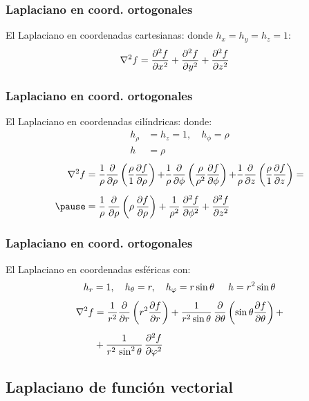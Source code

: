 \documentclass[12pt]{beamer}
\begin{document}
\begin{frame}
\frametitle{Laplaciano en coord. ortogonales}
El Laplaciano en coordenadas cartesianas:
\pause
donde $h_{x} = h_{y} = h_{z} = 1$:
\begin{align*}
\laplacian{f} &= \pdv[2]{f}{x} + \pdv[2]{f}{y} + \pdv[2]{f}{z}
\end{align*}
\end{frame}
\begin{frame}
\frametitle{Laplaciano en coord. ortogonales}
El Laplaciano en coordenadas cilíndricas:
\pause
donde:
\begin{align*}
h_{\rho} &= h_{z} = 1, \quad h_{\phi} = \rho \\
h &= \rho
\end{align*}
\pause
\vspace*{-0.5cm}
\begin{eqnarray*}
\begin{aligned}
\laplacian{f} &= \dfrac{1}{\rho} \pdv{\rho} \left( \dfrac{\rho}{1} \pdv{f}{\rho} \right) {+} \dfrac{1}{\rho} \pdv{\phi} \left( \dfrac{\rho}{\rho^{2}} \pdv{f}{\phi} \right) {+} \dfrac{1}{\rho} \pdv{z} \left( \dfrac{\rho}{1} \pdv{f}{z} \right) = \\[0.5em] \pause
&= \dfrac{1}{\rho} \, \pdv{\rho} \left( \rho \, \pdv{f}{\rho} \right) + \dfrac{1}{\rho^{2}} \, \pdv[2]{f}{\phi} + \pdv[2]{f}{z} 
\end{aligned}
\end{eqnarray*}
\end{frame}
\begin{frame}
\frametitle{Laplaciano en coord. ortogonales}
El Laplaciano en coordenadas esféricas con:
\begin{align*}
h_{r} = 1, \quad h_{\theta} = r, \quad h_{\varphi} = r \sin \theta \hspace{0.5cm} h = r^{2} \sin \theta
\end{align*}
\pause
\vspace*{-0.5cm}
\begin{align*}    
\laplacian{f} &= \dfrac{1}{r^{2}} \pdv{r} \left( r^{2} \pdv{f}{r} \right) + \dfrac{1}{r^{2} \sin \theta} \, \pdv{\theta} \left( \sin \theta \pdv{f}{\theta} \right) + \\[0.5em]
&+ \dfrac{1}{r^{2} \, \sin^{2} \theta} \, \pdv[2]{f}{\varphi}
\end{align*}
\end{frame}

\subsection*{Laplaciano de función vectorial}
\end{document}

